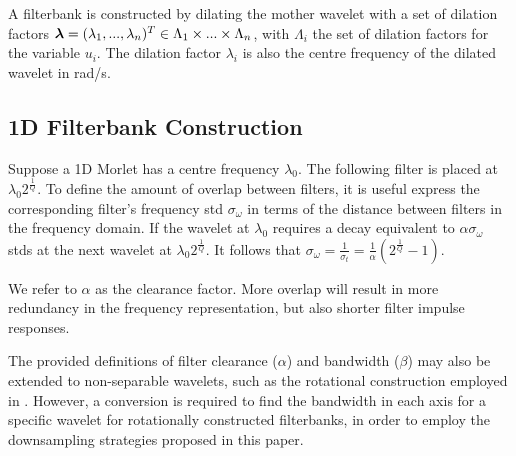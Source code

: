 A filterbank is constructed by dilating the mother wavelet with a set of dilation factors $\boldsymbol{\mathbf{\lambda}} =(\lambda_1, ..., \lambda_n )^T \in \Lambda_1 \times ... \times \Lambda_n$, with $\Lambda_i$ the set of dilation factors for the variable $u_i$. The dilation factor $\lambda_i$ is also the centre frequency of the dilated wavelet in rad/s. 



\subsection{1D Filterbank Construction}
\label{sec:filterbank}
 Suppose a 1D Morlet has a centre frequency $\lambda_0$. The following filter is placed at $\lambda_0 2^{\frac{1}{Q}}$. To define the amount of overlap between filters, it is useful express the corresponding filter's frequency \ac{std} $\sigma_\omega$ in terms of the distance between filters in the frequency domain. If the wavelet at $\lambda_0$ requires a decay equivalent to $\alpha \sigma_\omega$ \ac{std}s at the next wavelet at $\lambda_0 2^{\frac{1}{Q}}$. It follows that $\sigma_\omega = \frac{1}{\sigma_t} = \frac{1}{\alpha}\left( 2^\frac{1}{Q} - 1 \right)$.

We refer to $\alpha$ as the clearance factor. More overlap will result in more redundancy in the frequency representation, but also shorter filter impulse responses. 


The provided definitions of filter clearance ($\alpha$) and bandwidth ($\beta$) may also be extended to non-separable wavelets, such as the rotational construction employed in \citep{2dscattering}. However, a conversion is required to find the bandwidth in each axis for a specific wavelet for rotationally constructed filterbanks, in order to employ the downsampling strategies proposed in this paper.


